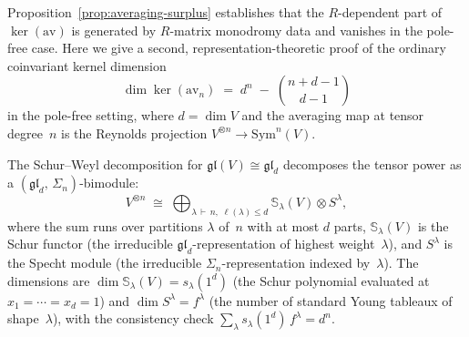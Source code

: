 \begin{remark}
\label{rem:schur-weyl-kernel}
Proposition~\ref{prop:averaging-surplus} establishes that
the $R$-dependent part of $\ker(\mathrm{av})$ is generated by
$R$-matrix monodromy data and vanishes in the pole-free case. Here we
give a second, representation-theoretic proof of the ordinary
coinvariant kernel dimension
\begin{equation}\label{eq:kernel-dim-averaging}
\dim\ker(\mathrm{av}_n)
\;=\;
d^n \;-\; \binom{n+d-1}{d-1}
\end{equation}
in the pole-free setting, where $d = \dim V$ and the averaging map at
tensor degree~$n$ is the Reynolds projection
$V^{\otimes n} \to \mathrm{Sym}^n(V)$.

The Schur--Weyl decomposition for $\mathfrak{gl}(V) \cong \mathfrak{gl}_d$
decomposes the tensor power as a $(\mathfrak{gl}_d,\,\Sigma_n)$-bimodule:
\begin{equation}\label{eq:schur-weyl-decomp-app}
V^{\otimes n}
\;\cong\;
\bigoplus_{\lambda \,\vdash\, n,\;
\ell(\lambda) \leq d}
\mathbb{S}_\lambda(V) \otimes S^\lambda,
\end{equation}
where the sum runs over partitions $\lambda$ of~$n$ with at most $d$
parts, $\mathbb{S}_\lambda(V)$ is the Schur functor (the irreducible
$\mathfrak{gl}_d$-representation of highest weight~$\lambda$), and
$S^\lambda$ is the Specht module (the irreducible
$\Sigma_n$-representation indexed by~$\lambda$).
The dimensions are $\dim \mathbb{S}_\lambda(V) = s_\lambda(1^d)$
(the Schur polynomial evaluated at $x_1 = \cdots = x_d = 1$)
and $\dim S^\lambda = f^\lambda$ (the number of standard Young
tableaux of shape~$\lambda$), with the consistency check
$\sum_\lambda s_\lambda(1^d)\,f^\lambda = d^n$.


\end{remark}
